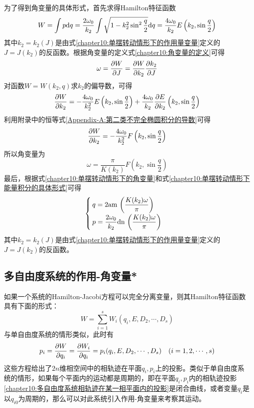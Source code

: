为了得到角变量的具体形式，首先求得Hamilton特征函数
\begin{equation}
	W = \int p\mathrm{d} q = \frac{2\omega_0}{k_2} \int \sqrt{1-k_2^2\sin^2\frac q2}\mathrm{d} q = \frac{4\omega_0}{k_2} E\left(k_2, \sin\frac q2\right)
\end{equation}
其中$k_2=k_2(J)$是由式\eqref{chapter10:单摆转动情形下的作用量变量}定义的$J=J(k_2)$的反函数。根据角变量的定义式\eqref{chapter10:角变量的定义}可得
\begin{equation}
	\omega = \frac{\partial W}{\partial J} = \frac{\partial W}{\partial k_2} \frac{\partial k_2}{\partial J}
\end{equation}
对函数$W=W(k_2,q)$求$k_2$的偏导数，可得
\begin{equation}
	\frac{\partial W}{\partial k_2} = -\frac{4\omega_0}{k_2^2}E\left(k_2, \sin\frac q2\right) + \frac{4\omega_0}{k_2}\frac{\partial E}{\partial k_2}\left(k_2, \sin\frac q2\right)
\end{equation}
利用附录中的恒等式\eqref{Appendix-A:第二类不完全椭圆积分的导数}可得
\begin{equation}
	\frac{\partial W}{\partial k_2} = -\frac{4\omega_0}{k_2^2}F\left(k_2, \sin\frac q2\right)
\end{equation}
所以角变量为
\begin{equation}
	\omega = \frac{\pi}{K(k_2)}F\left(k_2,\sin\frac q2\right)
	\label{chapter10:单摆转动情形下的角变量}
\end{equation}
最后，根据式\eqref{chapter10:单摆转动情形下的角变量}和式\eqref{chapter10:单摆转动情形下能量积分的具体形式}可得
\begin{equation}
\begin{cases}
	\displaystyle q = 2\mathrm{am}\,\left(\frac{K(k_2)\omega}{\pi}\right) \\[1.5ex]
	\displaystyle p = \frac{2\omega_0}{k_2}\mathrm{dn}\,\left(\frac{K(k_2)\omega}{\pi}\right)
\end{cases}
\end{equation}
其中$k_2=k_2(J)$是由式\eqref{chapter10:单摆转动情形下的作用量变量}定义的$J=J(k_2)$的反函数。

\subsection{多自由度系统的作用-角变量*}

如果一个系统的Hamilton-Jacobi方程可以完全分离变量，则其Hamilton特征函数具有下面的形式：
\begin{equation}
	W = \sum_{i=1}^s W_i(q_i,E,D_2,\cdots,D_s)
	\label{chapter10:多自由度系统的Hamilton特征函数}
\end{equation}
与单自由度系统的情形类似，此时有
\begin{equation}
	p_i = \frac{\partial W}{\partial q_i} = \frac{\partial W_i}{\partial q_i} = p_i(q_i,E,D_2,\cdots,D_s)\quad (i=1,2,\cdots,s)
	\label{chapter10:多自由度系统相轨迹在某一相平面内的投影}
\end{equation}
这些方程给出了$2n$维相空间中的相轨迹在平面$q_i,p_i$上的投影。类似于单自由度系统的情形，如果每个平面内的运动都是周期的，即在平面$q_i,p_i$内的相轨迹投影\eqref{chapter10:多自由度系统相轨迹在某一相平面内的投影}是闭合曲线，或者变量$q_i$是以$q_{i0}$为周期的，那么可以对此系统引入作用-角变量来考察其运动。


